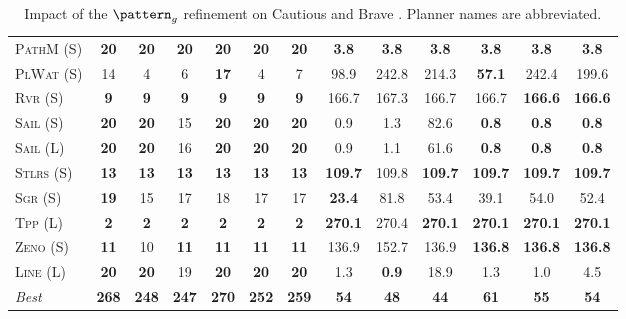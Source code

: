 \begin{table}[tb]
{\begin{tabular}{|l||cccccc||cccccc||}
\textsc{PathM} (S)&\textbf{20}&\textbf{20}&\textbf{20}&\textbf{20}&\textbf{20}&\textbf{20}&\textbf{3.8}&\textbf{3.8}&\textbf{3.8}&\textbf{3.8}&\textbf{3.8}&\textbf{3.8}\\
\textsc{PlWat} (S)&14&4&6&\textbf{17}&4&7&98.9&242.8&214.3&\textbf{57.1}&242.4&199.6\\
\textsc{Rvr} (S)&\textbf{9}&\textbf{9}&\textbf{9}&\textbf{9}&\textbf{9}&\textbf{9}&166.7&167.3&166.7&166.7&\textbf{166.6}&\textbf{166.6}\\
\textsc{Sail} (S)&\textbf{20}&\textbf{20}&15&\textbf{20}&\textbf{20}&\textbf{20}&0.9&1.3&82.6&\textbf{0.8}&\textbf{0.8}&\textbf{0.8}\\
\textsc{Sail} (L)&\textbf{20}&\textbf{20}&16&\textbf{20}&\textbf{20}&\textbf{20}&0.9&1.1&61.6&\textbf{0.8}&\textbf{0.8}&\textbf{0.8}\\
\textsc{Stlrs} (S)&\textbf{13}&\textbf{13}&\textbf{13}&\textbf{13}&\textbf{13}&\textbf{13}&\textbf{109.7}&109.8&\textbf{109.7}&\textbf{109.7}&\textbf{109.7}&\textbf{109.7}\\
\textsc{Sgr} (S)&\textbf{19}&15&17&18&17&17&\textbf{23.4}&81.8&53.4&39.1&54.0&52.4\\
\textsc{Tpp} (L)&\textbf{2}&\textbf{2}&\textbf{2}&\textbf{2}&\textbf{2}&\textbf{2}&\textbf{270.1}&270.4&\textbf{270.1}&\textbf{270.1}&\textbf{270.1}&\textbf{270.1}\\
\textsc{Zeno} (S)&\textbf{11}&10&\textbf{11}&\textbf{11}&\textbf{11}&\textbf{11}&136.9&152.7&136.9&\textbf{136.8}&\textbf{136.8}&\textbf{136.8}\\
\textsc{Line} (L)&\textbf{20}&\textbf{20}&19&\textbf{20}&\textbf{20}&\textbf{20}&1.3&\textbf{0.9}&18.9&1.3&1.0&4.5
\\\hline
\textit{Best}&\textbf{268}&\textbf{248}&\textbf{247}&\textbf{270}&\textbf{252}&\textbf{259}&\textbf{54}&\textbf{48}&\textbf{44}&\textbf{61}&\textbf{55}&\textbf{54}\\\hline

        \end{tabular}}
        \caption{Impact of the $\pattern_g$ refinement on Cautious and Brave \pattyd. Planner names are abbreviated.}
        \label{tab:abl-patterng}
        \end{table}
        